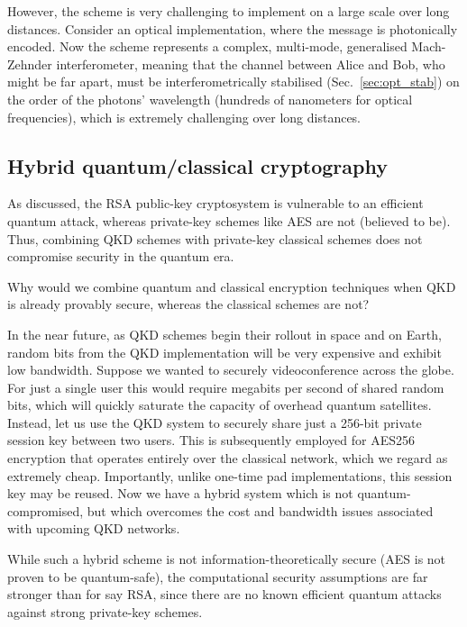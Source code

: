 However, the scheme is very challenging to implement on a large scale over long distances. Consider an optical implementation, where the message is photonically encoded. Now the scheme represents a complex, multi-mode, generalised Mach-Zehnder interferometer, meaning that the channel between Alice and Bob, who might be far apart, must be interferometrically stabilised (Sec.~\ref{sec:opt_stab}) on the order of the photons' wavelength (hundreds of nanometers for optical frequencies), which is extremely challenging over long distances.

%
%

\subsection{Hybrid quantum/classical cryptography}

As discussed, the RSA public-key cryptosystem is vulnerable to an efficient quantum attack, whereas private-key schemes like AES are not (believed to be). Thus, combining QKD schemes with private-key classical schemes does not compromise security in the quantum era.

Why would we combine quantum and classical encryption techniques when QKD is already provably secure, whereas the classical schemes are not?

In the near future, as QKD schemes begin their rollout in space and on Earth, random bits from the QKD implementation will be very expensive and exhibit low bandwidth. Suppose we wanted to securely videoconference across the globe. For just a single user this would require megabits per second of shared random bits, which will quickly saturate the capacity of overhead quantum satellites. Instead, let us use the QKD system to securely share just a 256-bit private session key between two users. This is subsequently employed for AES256 encryption that operates entirely over the classical network, which we regard as extremely cheap. Importantly, unlike one-time pad implementations, this session key may be reused. Now we have a hybrid system which is not quantum-compromised, but which overcomes the cost and bandwidth issues associated with upcoming QKD networks.

While such a hybrid scheme is not information-theoretically secure (AES is not proven to be quantum-safe), the computational security assumptions are far stronger than for say RSA, since there are no known efficient quantum attacks against strong private-key schemes.


